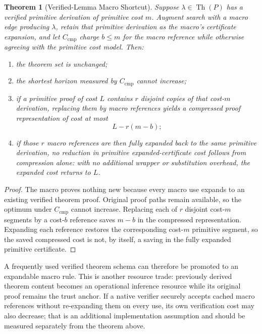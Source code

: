 \documentclass[11pt]{article}
\newtheorem{theorem}{Theorem}[section]
\theoremstyle{definition}
\theoremstyle{remark}
\newcommand{\Th}{\operatorname{Th}}
\begin{document}
\begin{theorem}[Verified-Lemma Macro Shortcut]\label{thm:macro}
Suppose $\lambda\in\Th(P)$ has a verified primitive derivation of primitive cost $m$. Augment search with a macro edge producing $\lambda$, retain that primitive derivation as the macro's certificate expansion, and let $C_{\mathrm{cmp}}$ charge $b\le m$ for the macro reference while otherwise agreeing with the primitive cost model. Then:
\begin{enumerate}[label=(\roman*)]
\item the theorem set is unchanged;
\item the shortest horizon measured by $C_{\mathrm{cmp}}$ cannot increase;
\item if a primitive proof of cost $L$ contains $r$ disjoint copies of that cost-$m$ derivation, replacing them by macro references yields a compressed proof representation of cost at most
\[
L-r(m-b);
\]
\item if those $r$ macro references are then fully expanded back to the same primitive derivation, no reduction in primitive expanded-certificate cost follows from compression alone: with no additional wrapper or substitution overhead, the expanded cost returns to $L$.
\end{enumerate}
\end{theorem}

\begin{proof}
The macro proves nothing new because every macro use expands to an existing verified theorem proof. Original proof paths remain available, so the optimum under $C_{\mathrm{cmp}}$ cannot increase. Replacing each of $r$ disjoint cost-$m$ segments by a cost-$b$ reference saves $m-b$ in the compressed representation. Expanding each reference restores the corresponding cost-$m$ primitive segment, so the saved compressed cost is not, by itself, a saving in the fully expanded primitive certificate.
\end{proof}

A frequently used verified theorem schema can therefore be promoted to an expandable macro rule. This is another resource trade: previously derived theorem content becomes an operational inference resource while its original proof remains the trust anchor. If a native verifier securely accepts cached macro references without re-expanding them on every use, its own verification cost may also decrease; that is an additional implementation assumption and should be measured separately from the theorem above.
\end{document}
